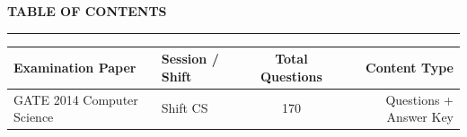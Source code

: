\documentclass[a4paper,10pt,twoside]{article}
\begin{document}
\newpage

\begin{center}
    {\Large\textbf{TABLE OF CONTENTS}}\\[0.4em]
    \rule{0.5\textwidth}{0.6pt}
\end{center}
\vspace{1em}

\noindent\begin{tabularx}{\linewidth}{|X|l|c|r|}
\hline
\textbf{Examination Paper} & \textbf{Session / Shift} & \textbf{Total Questions} & \textbf{Content Type} \\
\hline

GATE 2014 Computer Science & Shift CS & 170 & Questions + Answer Key \\ \hline
\end{tabularx}

\vspace{1.5em}

\newpage
\end{document}
